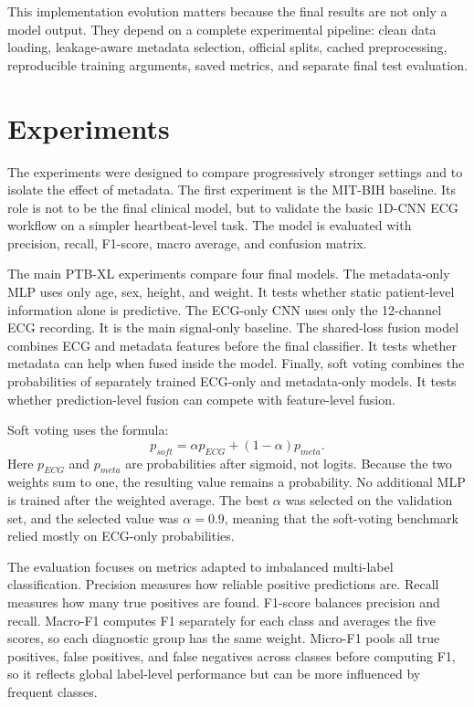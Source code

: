 \documentclass[11pt,a4paper]{article}
\begin{document}
This implementation evolution matters because the final results are not only a model output. They depend on a complete experimental pipeline: clean data loading, leakage-aware metadata selection, official splits, cached preprocessing, reproducible training arguments, saved metrics, and separate final test evaluation.

\section{Experiments}

The experiments were designed to compare progressively stronger settings and to isolate the effect of metadata. The first experiment is the MIT-BIH baseline. Its role is not to be the final clinical model, but to validate the basic 1D-CNN ECG workflow on a simpler heartbeat-level task. The model is evaluated with precision, recall, F1-score, macro average, and confusion matrix.

The main PTB-XL experiments compare four final models. The metadata-only MLP uses only age, sex, height, and weight. It tests whether static patient-level information alone is predictive. The ECG-only CNN uses only the 12-channel ECG recording. It is the main signal-only baseline. The shared-loss fusion model combines ECG and metadata features before the final classifier. It tests whether metadata can help when fused inside the model. Finally, soft voting combines the probabilities of separately trained ECG-only and metadata-only models. It tests whether prediction-level fusion can compete with feature-level fusion.

Soft voting uses the formula:
\[
p_{soft}=\alpha p_{ECG}+(1-\alpha)p_{meta}.
\]
Here \(p_{ECG}\) and \(p_{meta}\) are probabilities after sigmoid, not logits. Because the two weights sum to one, the resulting value remains a probability. No additional MLP is trained after the weighted average. The best \(\alpha\) was selected on the validation set, and the selected value was \(\alpha=0.9\), meaning that the soft-voting benchmark relied mostly on ECG-only probabilities.

The evaluation focuses on metrics adapted to imbalanced multi-label classification. Precision measures how reliable positive predictions are. Recall measures how many true positives are found. F1-score balances precision and recall. Macro-F1 computes F1 separately for each class and averages the five scores, so each diagnostic group has the same weight. Micro-F1 pools all true positives, false positives, and false negatives across classes before computing F1, so it reflects global label-level performance but can be more influenced by frequent classes.
\end{document}
